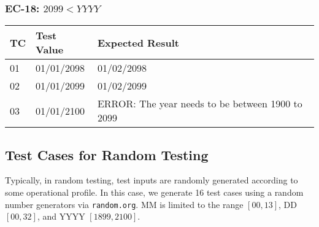 \documentclass[11pt, oneside]{article}   	%
\begin{document}
\subsubsection{EC-18: $2099 < YYYY$}
\begin{table}[H]
\begin{tabular}{|l|l|l|}
\hline
TC & Test Value & Expected Result                                  \\ \hline
01 & 01/01/2098 & 01/02/2098                                       \\ \hline
02 & 01/01/2099 & 01/02/2099                                       \\ \hline
03 & 01/01/2100 & ERROR: The year needs to be between 1900 to 2099 \\ \hline
\end{tabular}
\end{table}

\subsection{Test Cases for Random Testing}
Typically, in random testing, test inputs are randomly generated according to some operational profile. In this case, we generate 16 test cases using a random number generators via \texttt{random.org}. MM is limited to the range $[00, 13]$, DD $[00, 32]$, and YYYY $[1899, 2100]$.
\end{document}
